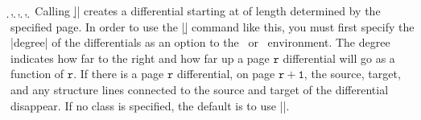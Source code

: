 \begin{sseqdata}[name = basic, cohomological Serre grading]
\begin{commandlist}{
    {\d\ooptions{}},
    {\d\ooptions{}},
    {\d\ooptions{}\pars{\sourcename\opt{,\targetn}}},
    {\d\ooptions{}\pars{\sourcecoord}\pars{\targetcoord}}%
}
Calling |\d{}| creates a differential starting at  of length determined by the specified page. In order to use the |\d| command like this, you must first specify the |degree| of the differentials as an option to the \sseqdataenv\  or \sseqpageenv\  environment. The degree indicates how far to the right and how far up a page $\mathtt{r}$ differential will go as a function of $\mathtt{r}$. If there is a page $\mathtt{r}$ differential, on page $\mathtt{r+1}$, the source, target, and any structure lines connected to the source and target of the differential disappear. If no class is specified, the default is to use |\lastclass|.


\end{commandlist}
\end{sseqdata}
